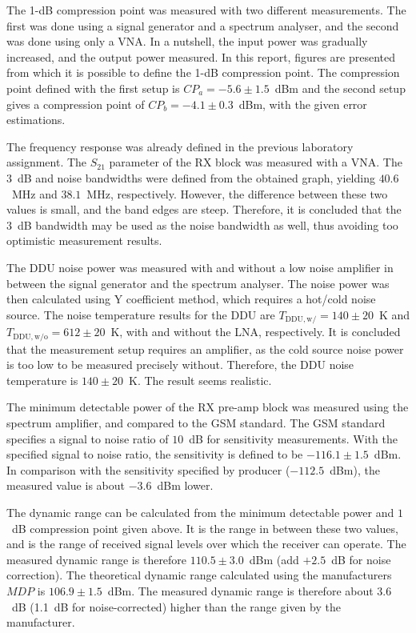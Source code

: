 \documentclass[a4paper, 12pt]{article}
\begin{document}
The 1-dB compression point was measured with two different measurements. The first was done 
using a signal generator and a spectrum analyser, and the second was done using only a VNA. 
In a nutshell, the input power was gradually increased, and the output power measured. In this 
report, figures are presented from which it is possible to define the 1-dB compression point. 
The compression point defined with the first setup is $CP_a = -5.6 \pm 1.5$~dBm and the second 
setup gives a compression point of $CP_b = -4.1 \pm 0.3$~dBm, with the given error estimations.

The frequency response was already defined in the previous laboratory assignment. The $S_{21}$ 
parameter of the RX block was measured with a VNA. The $3$~dB and noise bandwidths were 
defined from the obtained graph, yielding $40.6$~MHz and $38.1$~MHz, respectively. However, 
the difference between these two values is small, and the band edges are steep. Therefore, it is concluded that the $3$~dB 
bandwidth may be used as the noise bandwidth as well, thus avoiding too optimistic measurement 
results.

The DDU noise power was measured with and without a low noise amplifier in between the signal 
generator and the spectrum analyser. The noise power was then calculated using Y coefficient
 method, which requires a hot/cold noise source. The noise temperature results for the DDU are 
 $T_\mathrm{DDU, w/} = 140 \pm 20$~K and $T_\mathrm{DDU, w/o} = 612 \pm 20$~K, with and without the 
 LNA, respectively. It is concluded that the measurement setup requires an amplifier, as the 
 cold source noise power is too low to be measured precisely without. Therefore, the DDU noise 
 temperature is $140 \pm 20$~K. The result seems realistic.

The minimum detectable power of the RX pre-amp block was measured using the spectrum amplifier, 
and compared to the GSM standard. The GSM standard specifies a signal to noise ratio of $10$~dB 
for sensitivity measurements. With the specified signal to noise ratio, the sensitivity is 
defined to be $-116.1 \pm 1.5$~dBm. In comparison with the sensitivity specified by producer 
($-112.5$~dBm), the measured value is about $-3.6$~dBm lower.

The dynamic range can be calculated from the minimum detectable power and $1$~dB compression 
point given above. It is the range in between these two values, and is the range of received 
signal levels over which the receiver can operate. The measured dynamic range is therefore 
$110.5 \pm 3.0$~dBm (add $+2.5$~dB for noise correction). The theoretical dynamic range calculated 
using the manufacturers $\textit{MDP}$ is $106.9 \pm 1.5$~dBm. The measured dynamic range is 
therefore about $3.6$~dB (1.1~dB for noise-corrected) higher than the range given by the manufacturer. 
\end{document}
